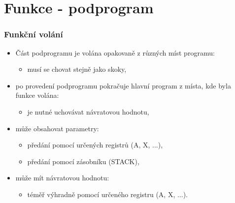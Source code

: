 \section{\texorpdfstring{Funkce - podprogram}{Funkce - podprogram}}

	\begin{frame}
    \frametitle{Funkční volání}
		
		
		\begin{itemize}
			\item Část podprogramu je volána opakovaně z různých míst programu:
			\begin{itemize}
				\item[$\Rightarrow$] musí se chovat stejně jako skoky,
			\end{itemize}
			
			\vspace{3mm}
			\item po provedení podprogramu pokračuje hlavní program z místa, kde byla funkce volána:
			\begin{itemize}
				\item[$\Rightarrow$] je nutné uchovávat návratovou hodnotu,
			\end{itemize}
			
			\vspace{3mm}
			\item může obsahovat parametry:
			
			\begin{itemize}
				\item[$\Rightarrow$] předání pomocí určených registrů (A, X, ...),
				\item[$\Rightarrow$] předání pomocí zásobníku (STACK),
			\end{itemize}
			
			\vspace{3mm}
			\item může mít návratovou hodnotu:
			\begin{itemize}
				\item[$\Rightarrow$] téměř výhradně pomocí určeného registru (A, X, ...).
			\end{itemize}
		\end{itemize}

	\end{frame}
	

